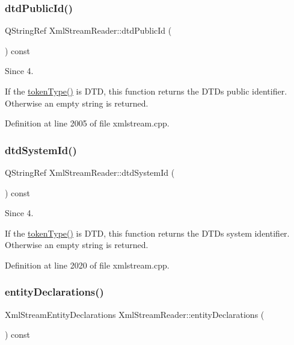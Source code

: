\subsubsection{\texorpdfstring{dtd\+Public\+Id()}{dtdPublicId()}}
{\footnotesize\ttfamily Q\+String\+Ref Xml\+Stream\+Reader\+::dtd\+Public\+Id (\begin{DoxyParamCaption}{ }\end{DoxyParamCaption}) const}

\begin{DoxySince}{Since}
4.
\end{DoxySince}
If the \hyperlink{class_xml_stream_reader_a2c26bfb63c27f2992e24f038d65c8c0a}{token\+Type()} is  D\+TD, this function returns the D\+TD\textquotesingle{}s public identifier. Otherwise an empty string is returned. 

Definition at line 2005 of file xmlstream.\+cpp.

\mbox{\label{class_xml_stream_reader_a8021ea53fd25af7404bfe81a2e4e7bdd}} 
\subsubsection{\texorpdfstring{dtd\+System\+Id()}{dtdSystemId()}}
{\footnotesize\ttfamily Q\+String\+Ref Xml\+Stream\+Reader\+::dtd\+System\+Id (\begin{DoxyParamCaption}{ }\end{DoxyParamCaption}) const}

\begin{DoxySince}{Since}
4.
\end{DoxySince}
If the \hyperlink{class_xml_stream_reader_a2c26bfb63c27f2992e24f038d65c8c0a}{token\+Type()} is  D\+TD, this function returns the D\+TD\textquotesingle{}s system identifier. Otherwise an empty string is returned. 

Definition at line 2020 of file xmlstream.\+cpp.

\mbox{\label{class_xml_stream_reader_a1746b1c8df6ec7a4172c5dbee907bfb3}} 
\subsubsection{\texorpdfstring{entity\+Declarations()}{entityDeclarations()}}
{\footnotesize\ttfamily Xml\+Stream\+Entity\+Declarations Xml\+Stream\+Reader\+::entity\+Declarations (\begin{DoxyParamCaption}{ }\end{DoxyParamCaption}) const}

